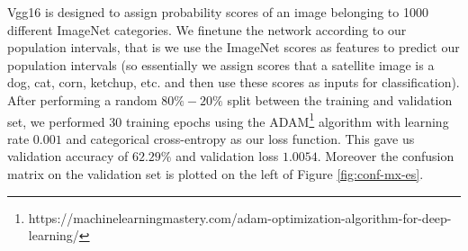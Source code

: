 \documentclass{article}
\begin{document}
Vgg16 is designed to assign probability scores of an image belonging to 1000 different ImageNet categories. We finetune the network according to our population intervals, that is we use the ImageNet scores as features to predict our population intervals (so essentially we assign scores that a satellite image is a dog, cat, corn, ketchup, etc. and then use these scores as inputs for classification). After performing a random $80\%-20\%$ split between the training and validation set, we performed 30 training epochs using the ADAM\footnote{https://machinelearningmastery.com/adam-optimization-algorithm-for-deep-learning/} algorithm with learning rate $0.001$ and categorical cross-entropy as our loss function. This gave us validation accuracy of $62.29\%$ and validation loss $1.0054$. Moreover the confusion matrix on the validation set is plotted on the left of Figure \ref{fig:conf-mx-es}.
\end{document}
